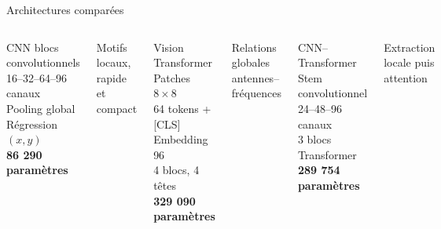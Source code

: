 \documentclass[aspectratio=169,10pt]{beamer}
\begin{document}
\begin{frame}{Architectures comparées}
  \begin{columns}[T,onlytextwidth]
      \begin{block}{CNN}
         blocs convolutionnels\\
        16--32--64--96 canaux\\[0.2cm]
        Pooling global\\
        Régression $(x,y)$\\[0.25cm]
        \textbf{86 290 paramètres}
      \end{block}
      \centering\scriptsize Motifs locaux, rapide et compact

      \begin{block}{Vision Transformer}
        \centering
        Patches $8\times8$\\
        64 tokens + [CLS]\\
        Embedding 96\\
        4 blocs, 4 têtes\\[0.25cm]
        \textbf{329 090 paramètres}
      \end{block}
      \centering\scriptsize Relations globales antennes--fréquences

      \begin{block}{CNN--Transformer}
        \centering
        Stem convolutionnel\\
        24--48--96 canaux\\
        3 blocs Transformer\\[0.25cm]
        \textbf{289 754 paramètres}
      \end{block}
      \centering\scriptsize Extraction locale puis attention
  \end{columns}

  \vspace{0.45cm}
\end{frame}
\end{document}

